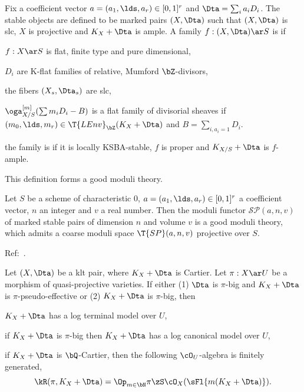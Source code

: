 \documentclass[article, a4paper, twoside]{universal}
\begin{document}
\begin{thm}[8.12, 8.13, 8.15]
	Fix a coefficient vector $a=(a_{1},\lds,a_{r})\in[0,1]^{r}$ and $\Dta=\sum_{i}a_{i}D_{i}$. The stable objects are defined to be marked pairs $(X,\Dta)$ such that $(X,\Dta)$ is slc, $X$ is projective and $K_{X}+\Dta$ is ample. A family $f:(X,\Dta)\ar S$ is  if
	\begin{itm}
		\item $f:X\ar S$ is flat, finite type and pure dimensional,
		\item $D_{i}$ are K-flat families of relative, Mumford $\bZ$-divisors,
		\item the fibers $(X_{s},\Dta_{s})$ are slc,
		\item $\oga_{X/S}^{[m]}(\sum m_{i}D_{i}-B)$ is a flat family of divisorial sheaves if $(m_{0},\lds,m_{r})\in\T{LEnv}_{\bZ}(K_{X}+\Dta)$ and $B=\sum_{i,a_{i}=1}D_{i}$.
	\end{itm}
	the family is  if it is locally KSBA-stable, $f$ is proper and $K_{X/S}+\Dta$ is $f$-ample.

	This definition forms a good moduli theory.
\end{thm}


\begin{thm}[8.1]
	Let $S$ be a scheme of characteristic $0$, $a=(a_{1},\lds,a_{r})\in[0,1]^{r}$ a coefficient vector, $n$ an integer and $v$ a real number. Then the moduli functor $\mathcal{SP}(a,n,v)$ of marked stable pairs of dimension $n$ and volume $v$ is a good moduli theory, which admits a coarse moduli space $\T{SP}(a,n,v)$ projective over $S$.
\end{thm}



Ref:~\cite{BCHM2010}.

\begin{thm}
	Let $(X,\Dta)$ be a klt pair, where $K_{X}+\Dta$ is Cartier. Let $\pi:X\ar U$ be a morphism of quasi-projective varieties. If either (1) $\Dta$ is $\pi$-big and $K_{X}+\Dta$ is $\pi$-pseudo-effective or (2) $K_{X}+\Dta$ is $\pi$-big, then
	\begin{itm}
		\item $K_{X}+\Dta$ has a log terminal model over $U$,
		\item if $K_{X}+\Dta$ is $\pi$-big then $K_{X}+\Dta$ has a log canonical model over $U$,
		\item if $K_{X}+\Dta$ is $\bQ$-Cartier, then the following $\cO_{U}$-algebra is finitely generated,
		\[
			\kR(\pi,K_{X}+\Dta)=\Op_{m\in\bN}\pi\zS\cO_{X}(\sFl{m(K_{X}+\Dta)}).
		\]
	\end{itm}
\end{thm}
\end{document}
